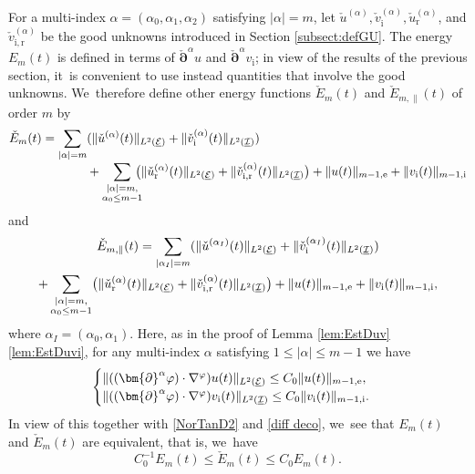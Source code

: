 \documentclass[10pt]{amsart}
\newcommand{\cI}{{\mathcal I}}
\newcommand{\cE}{{\mathcal E}}
\newcommand{\ul}[1]{\underline{#1}}
\theoremstyle{definition}
\begin{document}
For a multi-index $\alpha=(\alpha_0,\alpha_1,\alpha_2)$ satisfying $|\alpha|=m$, let $\check{u}^{(\alpha)}, \check{v}_\mathrm{i}^{(\alpha)},
\check{u}_\mathrm{r}^{(\alpha)}$, and $\check{v}_\mathrm{i,r}^{(\alpha)}$ be the good unknowns introduced in Section \ref{subsect:defGU}.
The energy $E_{m}(t)$ is defined in terms of $\check{\bm{\partial}}^\alpha u$ and $\check{\bm{\partial}}^\alpha v_\mathrm{i}$;
in view of the results of the previous section, it~is convenient to use instead quantities that involve the good unknowns. We~therefore define other energy functions $\check{E}_m(t)$ and $\check{E}_{m,\parallel}(t)$ of order $m$ by
\begin{align*}
\check{E}_m(t)
= \sum_{|\alpha|=m}&(\|\check{u}^{(\alpha)}(t)\|_{L^2(\ul{\cE})} + \|\check{v}_\mathrm{i}^{(\alpha)}(t)\|_{L^2(\ul{\cI})}) \\[-3pt]
&+ \sum_{\substack{|\alpha|=m, \\ \alpha_0\leq m-1}}\hspace*{-2mm}\bigl(\|\check{u}_\mathrm{r}^{(\alpha)}(t)\|_{L^2(\ul{\cE})} + \|\check{v}_\mathrm{i,r}^{(\alpha)}(t)\|_{L^2(\ul{\cI})}\bigr)
+ \|u(t)\|_{m-1,{\rm e}} + \|v_\mathrm{i}(t)\|_{m-1,{\rm i}}
\end{align*}
and
\begin{multline*}
\check{E}_{m,\parallel}(t)
= \sum_{|\alpha_I|=m}(\|\check{u}^{(\alpha_I)}(t)\|_{L^2(\ul{\cE})} + \|\check{v}_\mathrm{i}^{(\alpha_I)}(t)\|_{L^2(\ul{\cI})}) \\
+ \sum_{\substack{|\alpha|=m,\\ \alpha_0\leq m-1}}\bigl(\|\check{u}_\mathrm{r}^{(\alpha)}(t)\|_{L^2(\ul{\cE})} + \|\check{v}_\mathrm{i,r}^{(\alpha)}(t)\|_{L^2(\ul{\cI})}\bigr)
+ \|u(t)\|_{m-1,{\rm e}} + \|v_\mathrm{i}(t)\|_{m-1,{\rm i}},
\end{multline*}
where $\alpha_I=(\alpha_0,\alpha_1)$.
Here, as in the proof of Lemma \ref{lem:EstDuv}\eqref{lem:EstDuvi}, for any multi-index $\alpha$ satisfying $1\leq|\alpha|\leq m-1$ we have
\[
\begin{cases}
\|((\bm{\partial}^\alpha\varphi)\cdot\nabla^\varphi)u(t)\|_{L^2(\ul{\cE})} \leq C_0\|u(t)\|_{m-1,{\rm e}}, \\
\|((\bm{\partial}^\alpha\varphi)\cdot\nabla^\varphi)v_\mathrm{i}(t)\|_{L^2(\ul{\cI})} \leq C_0\|v_\mathrm{i}(t)\|_{m-1,{\rm i}}.
\end{cases}
\]
In view of this together with \eqref{NorTanD2} and \eqref{diff deco}, we~see that $E_m(t)$ and $\check{E}_m(t)$ are equivalent, that is, we~have
\begin{equation}\label{eqEcEm}
C_0^{-1}E_m(t) \leq \check{E}_m(t) \leq C_0E_m(t).
\end{equation}
\end{document}
